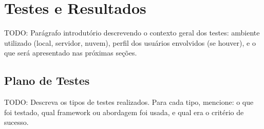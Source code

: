 %
%

\chapter{Testes e Resultados}
\label{cap:testes}

TODO: Parágrafo introdutório descrevendo o contexto geral dos testes:
ambiente utilizado (local, servidor, nuvem), perfil dos usuários envolvidos
(se houver), e o que será apresentado nas próximas seções.


\section{Plano de Testes}
\label{sec:plano-testes}

TODO: Descreva os tipos de testes realizados. Para cada tipo, mencione:
o que foi testado, qual framework ou abordagem foi usada, e qual era o
critério de sucesso.

